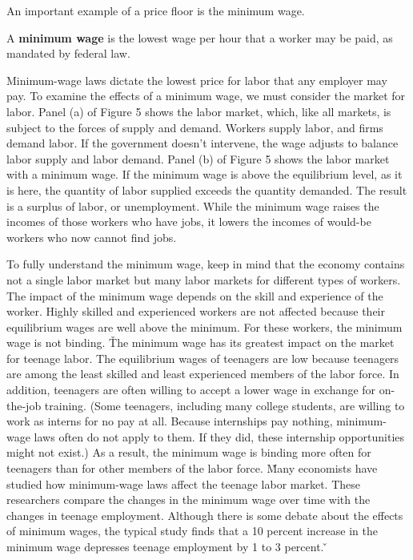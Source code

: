 An important example of a price floor is the minimum wage.

A \textbf{minimum wage} is the lowest wage per hour that a worker may be paid, as mandated by federal law.
\ed

Minimum-wage laws dictate the lowest price for labor that any employer may pay. To examine the effects of a minimum
wage, we must consider the market for labor. Panel (a) of Figure 5 shows the labor market, which, like all markets,
is subject to the forces of supply and demand. Workers supply labor, and firms demand labor. If the government
doesn't intervene, the wage adjusts to balance labor supply and labor demand. Panel (b) of Figure 5 shows the labor
market with a minimum wage. If the minimum wage is above the equilibrium level, as it is here, the quantity of labor
supplied exceeds the quantity demanded. The result is a surplus of labor, or unemployment. While the minimum wage
raises the incomes of those workers who have jobs, it lowers the incomes of would-be workers who now cannot find jobs.


To fully understand the minimum wage, keep in mind that the economy contains not a single labor market but many labor
markets for different types of workers. The impact of the minimum wage depends on the skill and experience of the
worker. Highly skilled and experienced workers are not affected because their equilibrium wages are well above the
minimum. For these workers, the minimum wage is not binding. \v

The minimum wage has its greatest impact on the market for teenage labor. The equilibrium wages of teenagers are low
because teenagers are among the least skilled and least experienced members of the labor force. In addition,
teenagers are often willing to accept a lower wage in exchange for on-the-job training. (Some teenagers, including
many college students, are willing to work as interns for no pay at all. Because internships pay nothing,
minimum-wage laws often do not apply to them. If they did, these internship opportunities might not exist.) As a
result, the minimum wage is binding more often for teenagers than for other members of the labor force. \v

Many economists have studied how minimum-wage laws affect the teenage labor market. These researchers compare the
changes in the minimum wage over time with the changes in teenage employment. Although there is some debate about the
effects of minimum wages, the typical study finds that a 10 percent increase in the minimum wage depresses teenage
employment by 1 to 3 percent. \v


